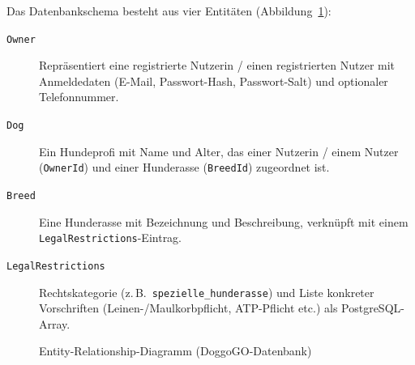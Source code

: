 Das Datenbankschema besteht aus vier Entitäten (Abbildung~\ref{fig:er-diagramm}):

\begin{description}
  \item[\texttt{Owner}] Repräsentiert eine registrierte Nutzerin / einen registrierten
    Nutzer mit Anmeldedaten (E-Mail, Passwort-Hash, Passwort-Salt) und optionaler
    Telefonnummer.
  \item[\texttt{Dog}] Ein Hundeprofi mit Name und Alter, das einer Nutzerin / einem
    Nutzer (\texttt{OwnerId}) und einer Hunderasse (\texttt{BreedId}) zugeordnet ist.
  \item[\texttt{Breed}] Eine Hunderasse mit Bezeichnung und Beschreibung, verknüpft mit
    einem \texttt{LegalRestrictions}-Eintrag.
  \item[\texttt{LegalRestrictions}] Rechtskategorie (z.\,B.\ \texttt{spezielle\_hunderasse})
    und Liste konkreter Vorschriften (Leinen-/Maulkorbpflicht, ATP-Pflicht etc.) als
    PostgreSQL-Array.
\end{description}

\begin{figure}[H]
  \centering
  \caption{Entity-Relationship-Diagramm (DoggoGO-Datenbank)}
  \label{fig:er-diagramm}
\end{figure}

